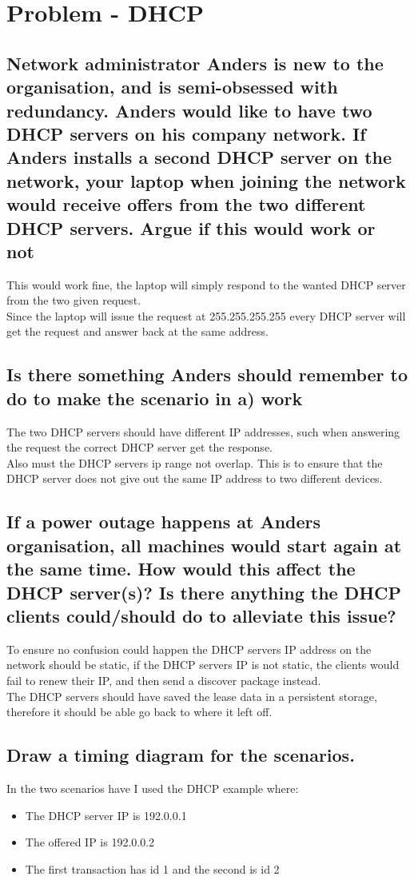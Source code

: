 \documentclass[12pt, a4paper]{article}
\begin{document}
	\section{Problem - DHCP}
		\subsection{Network administrator Anders is new to the organisation, and is semi-obsessed with redundancy. Anders would like to have two DHCP servers on his company network. If Anders installs a second DHCP server on the network, your laptop when joining the network would receive offers from the two different DHCP servers. Argue if this would work or not}
			This would work fine, the laptop will simply respond to the wanted DHCP server from the two given request.\\
			Since the laptop will issue the request at 255.255.255.255 every DHCP server will get the request and answer back at the same address.\\
		\subsection{Is there something Anders should remember to do to make the scenario in a) work}
			The two DHCP servers should have different IP addresses, such when answering the request the correct DHCP server get the response.\\
			Also must the DHCP servers ip range not overlap. This is to ensure that the DHCP server does not give out the same IP address to two different devices.
		\subsection{If a power outage happens at Anders organisation, all machines would start again at the same time. How would this affect the DHCP server(s)? Is there anything the DHCP clients could/should do to alleviate this issue?}
			To ensure no confusion could happen the DHCP servers IP address on the network should be static, if the DHCP servers IP is not static, the clients would fail to renew their IP, and then send a discover package instead.\\
			The DHCP servers should have saved the lease data in a persistent storage, therefore it should be able go back to where it left off.
		\subsection{Draw a timing diagram for the scenarios.}
			In the two scenarios have I used the DHCP example where:\\
			\begin{itemize}
				\item The DHCP server IP is 192.0.0.1
				\item The offered IP is 192.0.0.2
				\item The first transaction has id 1 and the second is id 2
			\end{itemize}
\end{document}
